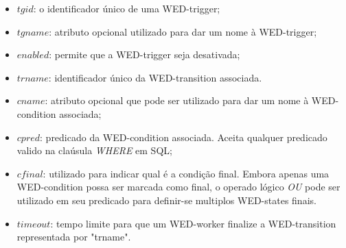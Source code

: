 \documentclass[conference]{IEEEtran}
\begin{document}
\begin{itemize}
\item $tgid$: o identificador único de uma WED-trigger;
\item $tgname$: atributo opcional utilizado para dar um nome à WED-trigger;
\item $enabled$: permite que a WED-trigger seja desativada;
\item $trname$: identificador único da WED-transition associada.
\item $cname$: atributo opcional que pode ser utilizado para dar um nome à WED-condition associada;
\item $cpred$: predicado da WED-condition associada. Aceita qualquer predicado valido na claúsula \emph{WHERE} em SQL;
\item $cfinal$: utilizado para indicar qual é a condição final. Embora apenas uma WED-condition possa ser marcada como final,
           o operado lógico \emph{OU} pode ser utilizado em seu predicado para definir-se multiplos WED-states finais.
\item $timeout$: tempo limite para que um WED-worker finalize a WED-transition representada por "trname".

\end{itemize}
\end{document}
